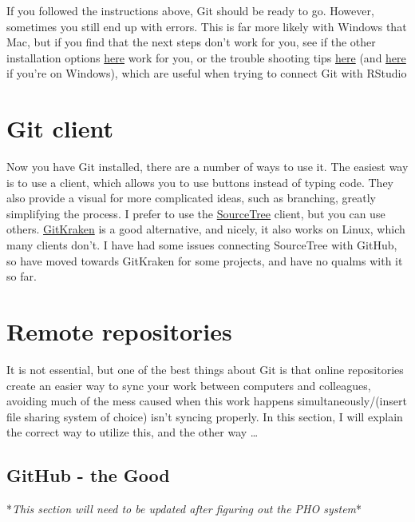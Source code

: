 \documentclass[]{book}
\begin{document}
If you followed the instructions above, Git should be ready to go. However, sometimes you still end up with errors. This is far more likely with Windows that Mac, but if you find that the next steps don't work for you, see if the other installation options \href{https://happyGitwithr.com/install-Git.html}{here} work for you, or the trouble shooting tips \href{https://happyGitwithr.com/troubleshooting.html}{here} (and \href{https://Github.com/jennybc/happy-Git-with-r/issues/67}{here} if you're on Windows), which are useful when trying to connect Git with RStudio

\hypertarget{git-client}{%
\section{Git client}\label{git-client}}

Now you have Git installed, there are a number of ways to use it. The easiest way is to use a client, which allows you to use buttons instead of typing code. They also provide a visual for more complicated ideas, such as branching, greatly simplifying the process. I prefer to use the \href{https://www.sourcetreeapp.com/}{SourceTree} client, but you can use others. \href{https://www.gitkraken.com/}{GitKraken} is a good alternative, and nicely, it also works on Linux, which many clients don't. I have had some issues connecting SourceTree with GitHub, so have moved towards GitKraken for some projects, and have no qualms with it so far.

\hypertarget{remote-repositories}{%
\section{Remote repositories}\label{remote-repositories}}

It is not essential, but one of the best things about Git is that online repositories create an easier way to sync your work between computers and colleagues, avoiding much of the mess caused when this work happens simultaneously/(insert file sharing system of choice) isn't syncing properly. In this section, I will explain the correct way to utilize this, and the other way \ldots{}

\hypertarget{github---the-good}{%
\subsection{GitHub - the Good}\label{github---the-good}}

*\emph{This section will need to be updated after figuring out the PHO system}*
\end{document}

